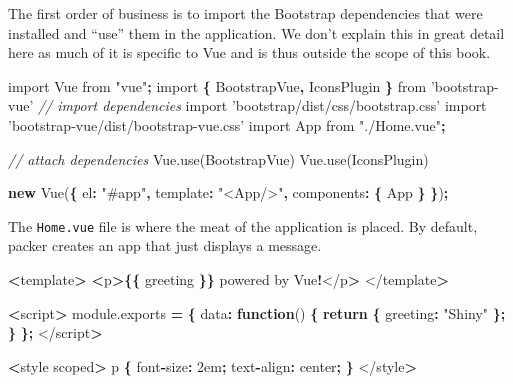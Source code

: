 \documentclass[10pt,]{krantz}
\makeatletter
\newenvironment{Shaded}{\begin{snugshade}}{\end{snugshade}}
\newcommand{\AttributeTok}[1]{\textcolor[rgb]{0.61,0.61,0.61}{#1}}
\newcommand{\CommentTok}[1]{\textcolor[rgb]{0.37,0.37,0.37}{\textit{#1}}}
\newcommand{\ControlFlowTok}[1]{\textcolor[rgb]{0.27,0.27,0.27}{\textbf{#1}}}
\newcommand{\DataTypeTok}[1]{\textcolor[rgb]{0.27,0.27,0.27}{#1}}
\newcommand{\ImportTok}[1]{#1}
\newcommand{\KeywordTok}[1]{\textcolor[rgb]{0.27,0.27,0.27}{\textbf{#1}}}
\newcommand{\NormalTok}[1]{#1}
\newcommand{\OperatorTok}[1]{\textcolor[rgb]{0.43,0.43,0.43}{\textbf{#1}}}
\newcommand{\StringTok}[1]{\textcolor[rgb]{0.5,0.5,0.5}{#1}}
\newcommand{\VariableTok}[1]{\textcolor[rgb]{0,0,0}{#1}}
\newenvironment{kframe}{%
\medskip{}
\setlength{\fboxsep}{.8em}
 \def\at@end@of@kframe{}%
 \ifinner\ifhmode%
  \def\at@end@of@kframe{\end{minipage}}%
  \begin{minipage}{\columnwidth}%
 \fi\fi%
 \def\FrameCommand##1{\hskip\@totalleftmargin \hskip-\fboxsep
 \colorbox{shadecolor}{##1}\hskip-\fboxsep
     \hskip-\linewidth \hskip-\@totalleftmargin \hskip\columnwidth}%
 \MakeFramed {\advance\hsize-\width
   \@totalleftmargin\z@ \linewidth\hsize
   \@setminipage}}%
 {\par\unskip\endMakeFramed%
 \at@end@of@kframe}
\renewenvironment{Shaded}{\begin{kframe}}{\end{kframe}}
\makeatother
\begin{document}
The first order of business is to import the Bootstrap dependencies that were installed and ``use'' them in the application. We don't explain this in great detail here as much of it is specific to Vue and is thus outside the scope of this book.

\begin{Shaded}
\begin{Highlighting}[]
\ImportTok{import}\NormalTok{ Vue }\ImportTok{from} \StringTok{"vue"}\OperatorTok{;}
\ImportTok{import} \OperatorTok{\{}\NormalTok{ BootstrapVue}\OperatorTok{,}\NormalTok{ IconsPlugin }\OperatorTok{\}} \ImportTok{from} \StringTok{'bootstrap-vue'}
\CommentTok{// import dependencies}
\ImportTok{import} \StringTok{'bootstrap/dist/css/bootstrap.css'}
\ImportTok{import} \StringTok{'bootstrap-vue/dist/bootstrap-vue.css'}
\ImportTok{import}\NormalTok{ App }\ImportTok{from} \StringTok{"./Home.vue"}\OperatorTok{;}

\CommentTok{// attach dependencies}
\VariableTok{Vue}\NormalTok{.}\AttributeTok{use}\NormalTok{(BootstrapVue)}
\VariableTok{Vue}\NormalTok{.}\AttributeTok{use}\NormalTok{(IconsPlugin)}

\KeywordTok{new} \AttributeTok{Vue}\NormalTok{(}\OperatorTok{\{}
  \DataTypeTok{el}\OperatorTok{:} \StringTok{"#app"}\OperatorTok{,}
  \DataTypeTok{template}\OperatorTok{:} \StringTok{"<App/>"}\OperatorTok{,}
  \DataTypeTok{components}\OperatorTok{:} \OperatorTok{\{}\NormalTok{ App }\OperatorTok{\}}
\OperatorTok{\}}\NormalTok{)}\OperatorTok{;}
\end{Highlighting}
\end{Shaded}

The \texttt{Home.vue} file is where the meat of the application is placed. By default, packer creates an app that just displays a message.

\begin{Shaded}
\begin{Highlighting}[]
\OperatorTok{<}\NormalTok{template}\OperatorTok{>}
  \OperatorTok{<}\NormalTok{p}\OperatorTok{>\{\{}\NormalTok{ greeting }\OperatorTok{\}\}}\NormalTok{ powered by Vue}\OperatorTok{!}\NormalTok{</p}\OperatorTok{>}
\NormalTok{</template}\OperatorTok{>}

\OperatorTok{<}\NormalTok{script}\OperatorTok{>}
\VariableTok{module}\NormalTok{.}\AttributeTok{exports} \OperatorTok{=} \OperatorTok{\{}
  \DataTypeTok{data}\OperatorTok{:} \KeywordTok{function}\NormalTok{() }\OperatorTok{\{}
    \ControlFlowTok{return} \OperatorTok{\{}
      \DataTypeTok{greeting}\OperatorTok{:} \StringTok{"Shiny"}
    \OperatorTok{\};}
  \OperatorTok{\}}
\OperatorTok{\};}
\NormalTok{</script}\OperatorTok{>}

\OperatorTok{<}\NormalTok{style scoped}\OperatorTok{>}
\NormalTok{p }\OperatorTok{\{}
\NormalTok{  font}\OperatorTok{-}\DataTypeTok{size}\OperatorTok{:}\NormalTok{ 2em}\OperatorTok{;}
\NormalTok{  text}\OperatorTok{-}\DataTypeTok{align}\OperatorTok{:}\NormalTok{ center}\OperatorTok{;}
\OperatorTok{\}}
\NormalTok{</style}\OperatorTok{>}
\end{Highlighting}
\end{Shaded}
\end{document}
